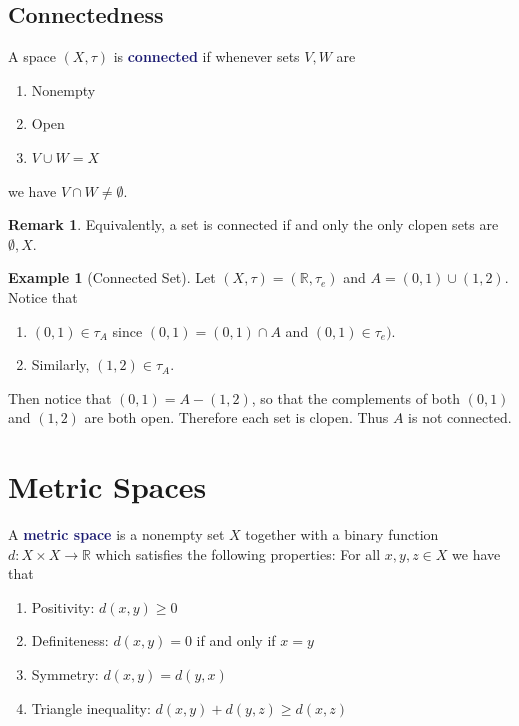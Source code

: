 \documentclass[11pt]{article}
\numberwithin{equation}{section}
\newcommand{\navy}[1]{\textcolor{MidnightBlue}{\bf #1}}
\newcounter{theo}[section]\setcounter{theo}{0}
\theoremstyle{definition}
\theoremstyle{definition}
\newtheorem{example}{\color{WildStrawberry}Example}[section]
\newtheorem*{remark}{Remark}
\newcommand{\1}{\mathbbm 1}
\def\t{\tau}
\newcommand{\RR}{\mathbb R}
\begin{document}
\subsection{Connectedness}

\begin{definition}[Connected]
	A space $(X,\t)$ is \navy{connected} if whenever sets $V,W$ are
	\begin{enumerate}
		\item Nonempty
		\item Open
		\item $V \cup W = X$
	\end{enumerate}
	we have $V \cap W \neq \emptyset$. 
\end{definition}

\begin{remark}
	Equivalently, a set is connected if and only the only clopen sets are $\emptyset, X$. 
\end{remark}

\begin{example}[Connected Set]
	Let $(X,\t) = (\RR,\t_e)$ and $A = (0,1) \cup (1,2)$. Notice that
	\begin{enumerate}
		\item $(0,1) \in \t_A$ since $(0,1) = (0,1) \cap A$ and $(0,1) \in \t_e)$. 
		\item Similarly, $(1,2) \in \t_A$. 
	\end{enumerate}
	Then notice that $(0,1) = A - (1,2)$, so that the complements of both $(0,1)$ and $(1,2)$ are both open. Therefore each set is clopen. Thus $A$ is not connected. 
\end{example}



\section{Metric Spaces}

\begin{definition}
	A \navy{metric space} is a nonempty set $X$ together with a binary function $d : X\times X \to \RR$ which satisfies the following properties: For all $x,y,z \in X$ we have that
	\begin{enumerate}
		\item Positivity: $d(x,y) \geq 0$
		\item Definiteness: $d(x,y) = 0$ if and only if $x=y$
		\item Symmetry: $d(x,y) = d(y,x)$
		\item Triangle inequality: $d(x,y) + d(y,z) \geq d(x,z)$
	\end{enumerate}
\end{definition}
\end{document}

